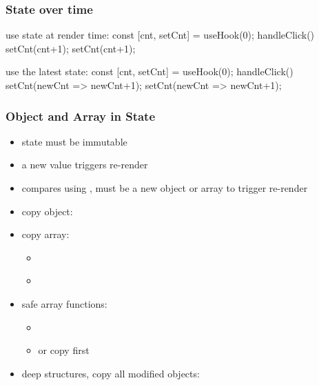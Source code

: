 \begin{frame}[fragile] \frametitle{State over time}
\begin{CodeBox}{use state at render time:}
const [cnt, setCnt] = useHook(0);
handleClick(){
  setCnt(cnt+1);
  setCnt(cnt+1);
}
\end{CodeBox}

\begin{CodeBox}{use the latest state:}
const [cnt, setCnt] = useHook(0);
handleClick(){
  setCnt(newCnt => newCnt+1);
  setCnt(newCnt => newCnt+1);
}
\end{CodeBox}
\end{frame}

\begin{frame}[fragile] \frametitle{Object and Array in State}
\begin{itemize}
  \item state must be immutable
  \item a new value triggers re-render
  \item compares using , must be a new object or array to trigger re-render
  \item copy object: 
  \item copy array:
  \begin{itemize}
    \item {}
    \item {}\\
  \end{itemize}
  \item safe array functions: 
  \begin{itemize} 
    \item {}
    \item or copy first \code{[...arr]}
  \end{itemize}
  \item deep structures, copy all modified objects: 
\end{itemize}
\end{frame}

